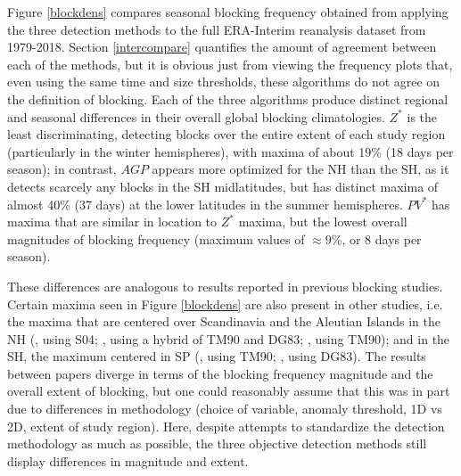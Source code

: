 \documentclass[smallextended]{svjour3}       %
\numberwithin{equation}{section}
\begin{document}
Figure \ref{blockdens} compares seasonal blocking frequency obtained from applying the three detection methods to the full ERA-Interim reanalysis dataset from 1979-2018. Section \ref{intercompare} quantifies the amount of agreement between each of the methods, but it is obvious just from viewing the frequency plots that, even using the same time and size thresholds, these algorithms do not agree on the definition of blocking. Each of the three algorithms produce distinct regional and seasonal differences in their overall global blocking climatologies. $Z^*$ is the least discriminating, detecting blocks over the entire extent of each study region (particularly in the winter hemispheres), with maxima of about 19\% (18 days per season); in contrast, $AGP$ appears more optimized for the NH than the SH, as it detects scarcely any blocks in the SH midlatitudes, but has distinct maxima of almost 40\% (37 days) at the lower latitudes in the summer hemispheres.  $PV^*$ has maxima that are similar in location to $Z^*$ maxima, but the lowest overall magnitudes of blocking frequency (maximum values of $\approx 9\%$, or 8 days per season). 


These differences are analogous to results reported in previous blocking studies. Certain maxima seen in Figure \ref{blockdens} are also present in other studies, i.e. the maxima that are centered over Scandinavia and the Aleutian Islands in the NH (\citealt{croci-maspoli_multifaceted_2007}, using S04; \citealt{dunn-sigouin_evaluation_2012}, using a hybrid of TM90 and DG83; \citealt{cheung_revisiting_2013}, using TM90); and in the SH, the maximum centered in SP (\citealt{wiedenmann_climatology_2002}, using TM90; \citealt{parsons_assessment_2016}, using DG83). The results between papers diverge in terms of the blocking frequency magnitude and the overall extent of blocking, but one could reasonably assume that this was in part due to differences in methodology (choice of variable, anomaly threshold, 1D vs 2D, extent of study region). Here, despite attempts to standardize the detection methodology as much as possible, the three objective detection methods still display differences in magnitude and extent. 
\end{document}
